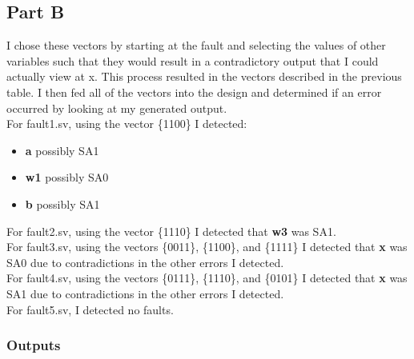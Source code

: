 \documentclass[a4paper, 12pt]{scrartcl}
\begin{document}
\newpage
\subsection{Part B}
\label{sec:org0e23936}
I chose these vectors by starting at the fault and selecting the values of other variables such that they would result in a contradictory output that I could actually view at x. This process resulted in the vectors described in the previous table. I then fed all of the vectors into the design and determined if an error occurred by looking at my generated output.\\

For fault1.sv, using the vector \{1100\} I detected:
\begin{itemize}
\item \textbf{a} possibly SA1
\item \textbf{w1} possibly SA0
\item \textbf{b} possibly SA1\\
\end{itemize}

For fault2.sv, using the vector \{1110\} I detected that \textbf{w3} was SA1.\\

For fault3.sv, using the vectors \{0011\}, \{1100\}, and \{1111\} I detected that \textbf{x} was SA0 due to contradictions in the other errors I detected.\\

For fault4.sv, using the vectors \{0111\}, \{1110\}, and \{0101\} I detected that \textbf{x} was SA1 due to contradictions in the other errors I detected.\\

For fault5.sv, I detected no faults.\\


\newpage
\subsubsection{Outputs}
\label{sec:org76d6025}
\end{document}
